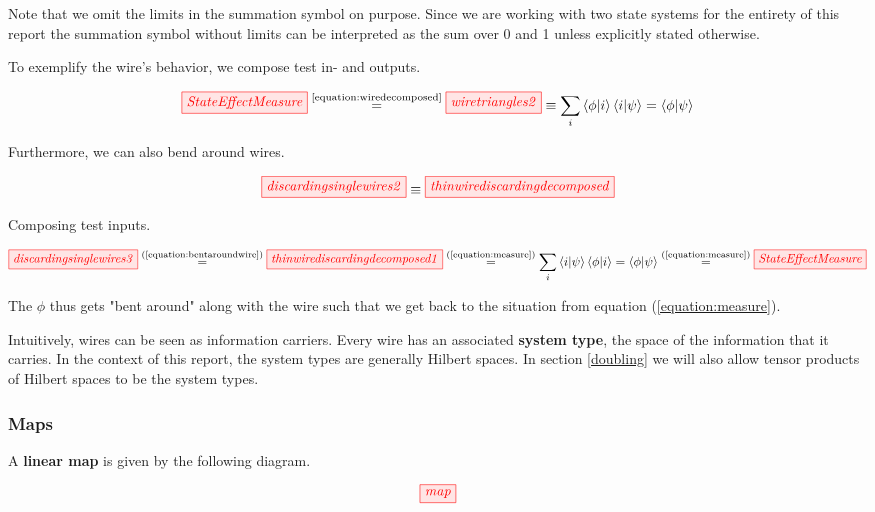 \documentclass[]{article}
\newcommand{\equaltext}[1]{\ensuremath{\stackrel{\text{#1}}{=}}}
\begin{document}
Note that we omit the limits in the summation symbol on purpose. Since we are working with two state systems for the entirety of this report the summation symbol without limits can be interpreted as the sum over 0 and 1 unless explicitly stated otherwise. 

To exemplify the wire's behavior, we compose test in- and outputs.

\begin{equation}
\label{equation:measure}
\tikzfig{StateEffectMeasure} \equaltext{\ref{equation:wiredecomposed}}  \tikzfig{wiretriangles2} \equiv \sum_{i}\bra{\phi}\ket{i}\bra{i}\ket{\psi} = \bra{\phi}\ket{\psi}
\end{equation}

Furthermore, we can also bend around wires.

\begin{equation}
\label{equation:bentaroundwire}
\tikzfig{discardingsinglewires2} \equiv
\tikzfig{thinwirediscardingdecomposed} 
\end{equation}

Composing test inputs.

\begin{equation}
\label{equation:bentaroundwiresinandoutputs}
\tikzfig{discardingsinglewires3} \equaltext{(\ref{equation:bentaroundwire})} \tikzfig{thinwirediscardingdecomposed1} \equaltext{(\ref{equation:measure})} \sum_{i}\bra{i}\ket{\psi}\bra{\phi}\ket{i} = \bra{\phi}\ket{\psi} \equaltext{(\ref{equation:measure})} \tikzfig{StateEffectMeasure}
\end{equation}

The $\phi$ thus gets "bent around" along with the wire such that we get back to the situation from equation (\ref{equation:measure}). 

Intuitively, wires can be seen as information carriers. Every wire has an associated \textbf{system type}, the space of the information that it carries. In the context of this report, the system types are generally Hilbert spaces. In section \ref{doubling} we will also allow tensor products of Hilbert spaces to be the system types.

\subsubsection{Maps}
\label{maps}

A \textbf{linear map} is given by the following diagram.

\begin{equation}
\tikzfig{map}
\end{equation}
\end{document}
